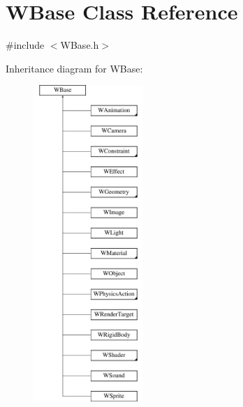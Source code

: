 \hypertarget{class_w_base}{}\section{W\+Base Class Reference}
\label{class_w_base}


{\ttfamily \#include $<$W\+Base.\+h$>$}

Inheritance diagram for W\+Base\+:\begin{figure}[H]
\begin{center}
\leavevmode
\includegraphics[height=12.000000cm]{class_w_base}
\end{center}
\end{figure}
